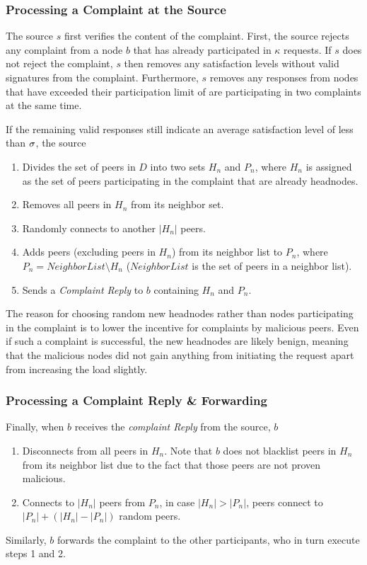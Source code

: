 \subsubsection*{Processing a Complaint at the Source}

The source $s$ first verifies the content of the complaint. First, the source rejects any complaint from a node $b$ that has already participated in $\kappa$ requests. 
If $s$ does not reject the complaint, $s$ then removes any satisfaction levels without valid signatures from the complaint.
Furthermore, $s$ removes any responses from nodes that have exceeded their participation limit of are participating in two complaints at the same time. 

If the remaining valid responses still indicate an average satisfaction level of less than $\sigma$, the source 
\begin{enumerate}
 \item Divides the set of peers in $D$ into two sets $H_n$ and $P_n$, where $H_n$ is assigned as the set of peers participating in the complaint that are already headnodes. 
 \item Removes all peers in $H_n$ from its neighbor set.
 \item Randomly connects to another $|H_n|$ peers. 
 \item Adds peers (excluding peers in $H_n$) from its neighbor list to $P_n$, where $P_n = NeighborList\setminus H_n$ ($NeighborList$ is the set of peers in a neighbor list). 
 \item Sends a \textit{Complaint Reply} to $b$ containing $H_n$ and $P_n$.
\end{enumerate}
 The reason for choosing random new headnodes rather than nodes participating in the complaint is to lower the incentive for complaints by malicious peers. Even if such a complaint is successful, the new headnodes are likely benign, meaning that the malicious nodes did not gain anything from initiating the request apart from increasing the load slightly. 


\subsubsection*{Processing a Complaint Reply \& Forwarding}

Finally, when $b$ receives the \textit{complaint Reply} from the source, $b$ 
\begin{enumerate}
 \item Disconnects from all peers in $H_n$. Note that $b$ does not blacklist peers in $H_n$ from its neighbor list due to the fact that those peers are not proven malicious.
 \item Connects to $|H_n|$ peers from $P_n$, in case $|H_n|>|P_n|$, peers connect to $|P_n|+(|H_n|-|P_n|)$ random peers.
\end{enumerate}
Similarly, $b$ forwards the complaint to the other participants, who in turn execute steps 1 and 2.

